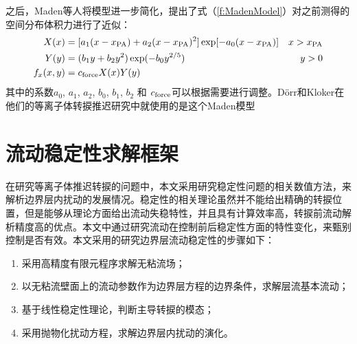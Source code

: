 之后，Maden等人\cite{Maden2013}将模型进一步简化，提出了式（\ref{f:MadenModel}）对之前测得的空间分布体积力进行了近似：
\begin{subequations}\label{f:MadenModel}
\begin{align}
    X(x)&=[a_1(x-x_{\rm PA})+a_2(x-x_{\rm PA})^2]\exp[-a_0(x-x_{\rm PA})] &x>x_{\rm PA}\\
    Y(y)&=(b_1y+b_2y^2)\exp(-b_0y^{2/5}) &y>0\\
    f_x(x,y)&=c_{\rm force}X(x)Y(y)&
\end{align}
\end{subequations}
其中的系数$a_0$, $a_1$, $a_2$, $b_0$, $b_1$,  $b_2$ 和 $c_{\rm force}$可以根据需要进行调整。D\"orr和Kloker\cite{dorr2016,dorr2015stabilisation}在他们的等离子体转捩推迟研究中就使用的是这个Maden模型
\section{流动稳定性求解框架}
在研究等离子体推迟转捩的问题中，本文采用研究稳定性问题的相关数值方法，来解析边界层内扰动的发展情况。稳定性的相关理论虽然并不能给出精确的转捩位置，但是能够从理论方面给出流动失稳特性，并且具有计算效率高，转捩前流动解析精度高的优点。本文中通过研究流动在控制前后稳定性方面的特性变化，来甄别控制是否有效。本文采用的研究边界层流动稳定性的步骤如下：
\begin{enumerate}
  \item 采用高精度有限元程序求解无粘流场；
  \item 以无粘流壁面上的流动参数作为边界层方程的边界条件，求解层流基本流动；
  \item 基于线性稳定性理论，判断主导转捩的模态；
  \item 采用抛物化扰动方程，求解边界层内扰动的演化。
\end{enumerate}

